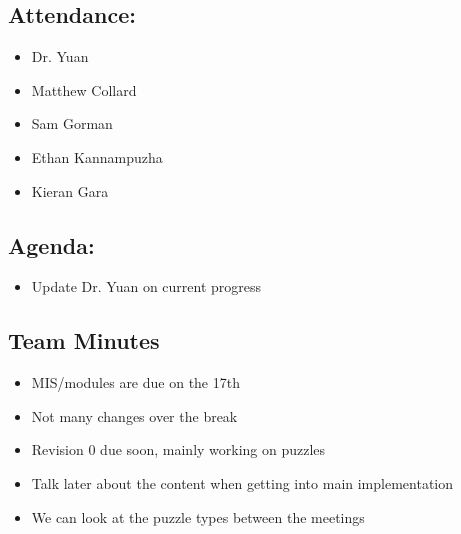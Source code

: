 \documentclass{article}
\begin{document}
\subsection*{Attendance:}
\begin{itemize}
    \item Dr. Yuan
    \item Matthew Collard
    \item Sam Gorman
    \item Ethan Kannampuzha
    \item Kieran Gara
\end{itemize}

\subsection*{Agenda:}
\begin{itemize}
    \item Update Dr. Yuan on current progress
\end{itemize}

\subsection*{Team Minutes}

\begin{itemize}
    \item MIS/modules are due on the 17th
    \item Not many changes over the break
    \item Revision 0 due soon, mainly working on puzzles
    \item Talk later about the content when getting into main implementation
    \item We can look at the puzzle types between the meetings
\end{itemize}
\end{document}
